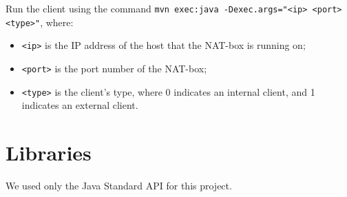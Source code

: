 \documentclass[10pt, a4paper]{article}
\begin{document}
Run the client using the command \texttt{mvn exec:java -Dexec.args="<ip> <port>
<type>"}, where:
\begin{itemize}
  \item \texttt{<ip>} is the IP address of the host that the NAT-box is running
    on;
  \item \texttt{<port>} is the port number of the NAT-box;
  \item \texttt{<type>} is the client's type, where 0 indicates an internal
    client, and 1 indicates an external client.
\end{itemize}



\section{Libraries}
\label{sec:libs}

We used only the Java Standard API for this project.
\end{document}
